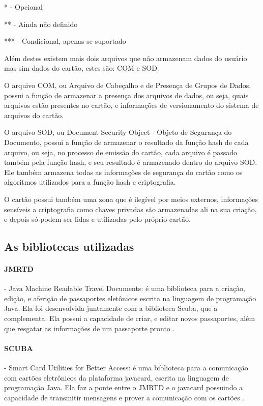 \documentclass[11pt]{article}
\begin{document}
		 * - Opcional
		 
		 ** - Ainda não definido
		 
		 *** - Condicional, apenas se suportado
		
		Além destes existem mais dois arquivos que não armazenam dados do usuário mas sim dados do cartão, estes são: COM e SOD.
		
        O arquivo COM, ou Arquivo de Cabeçalho e de Presença de Grupos de Dados, possui a função de armazenar a presença dos arquivos de dados, ou seja, quais arquivos estão presentes no cartão, e informações de versionamento do sistema de arquivos do cartão.
        
        O arquivo SOD, ou Document Security Object - Objeto de Segurança do Documento, possui a função de armazenar o resultado da função hash de cada arquivo, ou seja, no processo de emissão do cartão, cada arquivo é passado também pela função hash, e seu resultado é armazenado dentro do arquivo SOD. Ele também armazena todas as informações de segurança do cartão como os algoritmos utilizados para a função hash e criptografia.
        
        O cartão possui também uma zona que é ilegível por meios externos, informações sensíveis a criptografia como chaves privadas são armazenadas ali na sua criação, e depois só podem ser lidas e utilizadas pelo próprio cartão.
		

	\subsection{As bibliotecas utilizadas}
		
        \paragraph{JMRTD}
        
        - Java Machine Readable Travel Documents: é uma biblioteca para a criação, edição, e aferição de passaportes eletônicos escrita na linguagem de programação Java. Ela foi desenvolvida juntamente com a biblioteca Scuba, que a complementa. Ela possui a capacidade de criar, e editar novos passaportes, além que resgatar as informações de um passaporte pronto \parencite{JMRTD}. 
        
		\paragraph{SCUBA}

        - Smart Card Utilities for Better Access: é uma biblioteca para a comunicação com cartões eletrônicos da plataforma javacard, escrita na linguagem de programação Java. Ela faz a ponte entre o JMRTD e o javacard possuindo a capacidade de transmitir mensagens e prover a comunicação com os cartões \parencite{SCUBA}.
		
\end{document}

